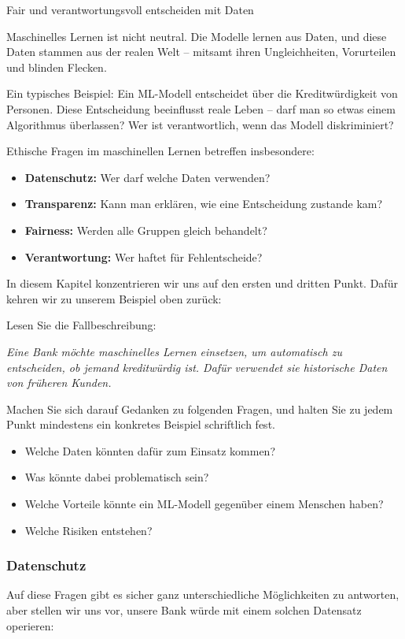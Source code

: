 \begin{lpu}{Fair und verantwortungsvoll entscheiden mit Daten}

Maschinelles Lernen ist nicht neutral. Die Modelle lernen aus Daten, und diese Daten stammen aus der realen Welt – mitsamt ihren Ungleichheiten, Vorurteilen und blinden Flecken.

Ein typisches Beispiel: Ein ML-Modell entscheidet über die Kreditwürdigkeit von Personen. Diese Entscheidung beeinflusst reale Leben – darf man so etwas einem Algorithmus überlassen? Wer ist verantwortlich, wenn das Modell diskriminiert?

Ethische Fragen im maschinellen Lernen betreffen insbesondere:
\begin{itemize}
  \item \textbf{Datenschutz:} Wer darf welche Daten verwenden?
  \item \textbf{Transparenz:} Kann man erklären, wie eine Entscheidung zustande kam?
  \item \textbf{Fairness:} Werden alle Gruppen gleich behandelt?
  \item \textbf{Verantwortung:} Wer haftet für Fehlentscheide?
\end{itemize}

In diesem Kapitel konzentrieren wir uns auf den ersten und dritten Punkt. Dafür kehren wir zu unserem Beispiel oben zurück:

\begin{aufgabe}{1}
Lesen Sie die Fallbeschreibung:

\emph{Eine Bank möchte maschinelles Lernen einsetzen, um automatisch zu entscheiden, ob jemand kreditwürdig ist. Dafür verwendet sie historische Daten von früheren Kunden.}

Machen Sie sich darauf Gedanken zu folgenden Fragen, und halten Sie zu jedem Punkt mindestens ein konkretes Beispiel schriftlich fest.

\begin{itemize}
  \item Welche Daten könnten dafür zum Einsatz kommen?
  \item Was könnte dabei problematisch sein?
  \item Welche Vorteile könnte ein ML-Modell gegenüber einem Menschen haben?
  \item Welche Risiken entstehen?
\end{itemize}
\end{aufgabe}

\subsubsection*{Datenschutz}
Auf diese Fragen gibt es sicher ganz unterschiedliche Möglichkeiten zu antworten, aber stellen wir uns vor, unsere Bank würde mit einem solchen Datensatz operieren:


\end{lpu}
